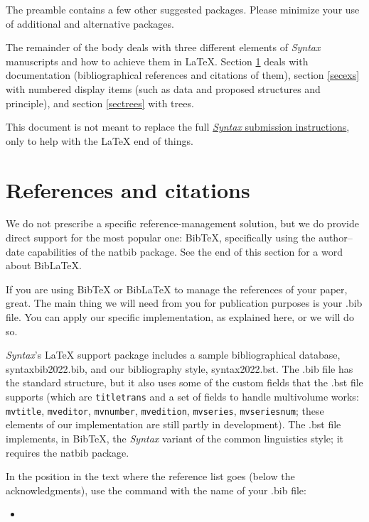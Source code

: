 \documentclass[letterpaper,12pt, twoside]{article}
\begin{document}
The preamble contains a few other suggested packages. Please minimize your use of additional and alternative packages.

The remainder of the body deals with three different elements of \emph{Syntax} manuscripts and how to achieve them in LaTeX. Section  \ref{secbib} deals with documentation (bibliographical references and citations of them), section \ref{secexs} with numbered display items (such as data and proposed structures and principle), and section \ref{sectrees} with trees.  

This document is not meant to replace the full \href{https://docs.google.com/document/d/1T0zHwq2b53VnqF18c8PKd-W_FWKqhKF0gkbBndoxj28/edit?usp=sharing}{\emph{Syntax} submission instructions}, only to help with the LaTeX end of things.


\section{References and citations}\label{secbib}
We do not prescribe a specific reference-management solution, but we do provide direct support for the most popular one: BibTeX, specifically using the author--date capabilities of the natbib package. See the end of this section for a word about BibLaTeX.

If you are using BibTeX or BibLaTeX to manage the references of your paper, great. The main thing we will need from you for publication purposes is your .bib file. You can apply our specific implementation, as explained here, or we will do so. 

\emph{Syntax}'s LaTeX support package includes a sample bibliographical database, syntaxbib2022.bib, and our bibliography style, syntax2022.bst. The .bib file has the standard structure, but it also uses some of the custom fields that the .bst file supports (which are \verb|titletrans| and a set of fields to handle multivolume works: \verb|mvtitle|, \verb|mveditor|, \verb|mvnumber|, \verb|mvedition|, \verb|mvseries|, \verb|mvseriesnum|; these elements of our implementation are still partly in development).
The .bst file implements, in BibTeX, the \emph{Syntax} variant of the common linguistics style; it requires the natbib package. 

In the position in the text where the reference list goes (below the acknowledgments), use the \verb|| command with the name of your .bib file:

\begin{itemize}
\item  \verb||
\end{itemize}
\end{document}
